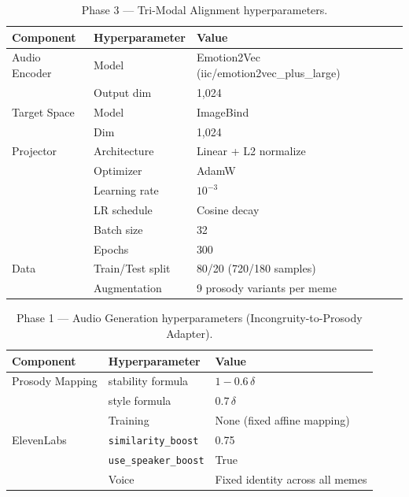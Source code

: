 \begin{table}[h]
\centering
\caption{Phase 3 — Tri-Modal Alignment hyperparameters.}
\label{tab:hparam_phase3}
\begin{tabular}{lll}
\toprule
\textbf{Component} & \textbf{Hyperparameter} & \textbf{Value} \\
\midrule
Audio Encoder  & Model           & Emotion2Vec (iic/emotion2vec\_plus\_large) \\
               & Output dim      & 1,024 \\
Target Space   & Model           & ImageBind \\
               & Dim             & 1,024 \\
\midrule
Projector      & Architecture    & Linear + L2 normalize \\
               & Optimizer       & AdamW \\
               & Learning rate   & $10^{-3}$ \\
               & LR schedule     & Cosine decay \\
               & Batch size      & 32 \\
               & Epochs          & 300 \\
\midrule
Data           & Train/Test split & 80/20 (720/180 samples) \\
               & Augmentation    & 9 prosody variants per meme \\
\bottomrule
\end{tabular}
\end{table}

\begin{table}[h]
\centering
\caption{Phase 1 — Audio Generation hyperparameters (Incongruity-to-Prosody Adapter).}
\label{tab:hparam_phase1}
\begin{tabular}{lll}
\toprule
\textbf{Component} & \textbf{Hyperparameter} & \textbf{Value} \\
\midrule
Prosody Mapping & stability formula   & $1 - 0.6\,\delta$ \\
                & style formula       & $0.7\,\delta$ \\
                & Training            & None (fixed affine mapping) \\
\midrule
ElevenLabs      & \texttt{similarity\_boost}    & 0.75 \\
                & \texttt{use\_speaker\_boost}  & True \\
                & Voice               & Fixed identity across all memes \\
\bottomrule
\end{tabular}
\end{table}


